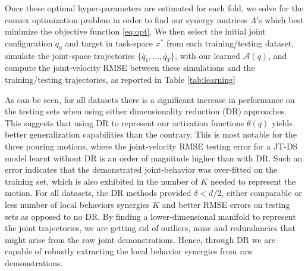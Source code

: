 \documentclass[letterpaper, 10 pt, conference,fleqn]{ieeeconf}
\begin{document}
Once these optimal hyper-parameters are estimated for each fold, we solve for the convex optimization problem in order to find our synergy matrices $A$'s which best minimize the objective function \eqref{eq:opt}. We then select the initial joint configuration $q_0$ and target in task-space $x^*$ from each training/testing dataset, simulate the joint-space trajectories $\{\dot{q_1},\dots,\dot{q_T}\}$, with our learned $\mathcal{A}(q)$, and compute the joint-velocity RMSE between these simulations and the training/testing trajectories, as reported in Table \ref{tab:learning} 

As can be seen, for all datasets there is a significant increase in performance on the testing sets when using either dimensionality reduction (DR) approaches. This suggests that using DR to represent our activation functions $\theta(q)$ yields better generalization capabilities than the contrary. This is most notable for the three pouring motions, where the joint-velocity RMSE testing error for a JT-DS model learnt without DR is an order of magnitude higher than with DR. Such an error indicates that the demonstrated joint-behavior was over-fitted on the training set, which is also exhibited in the number of $K$ needed to represent the motion. For all datasets, the DR methods provided $\delta < d/2$, either comparable or less number of local behaviors synergies $K$ and better RMSE errors on testing sets as opposed to no DR. By finding a lower-dimensional manifold to represent the joint trajectories, we are getting rid of outliers, noise and redundancies that might arise from the raw joint demonstrations. Hence, through DR we are capable of robustly extracting the local behavior synergies from raw demonstrations. 
\end{document}
